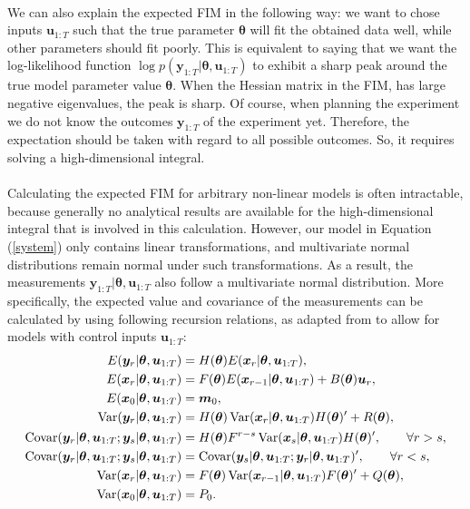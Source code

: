 \\
We can also explain the expected FIM in the following way: we want to chose inputs $\bm u_{1:T}$ such that the true parameter $\bm \theta$ will fit the obtained data well, while other parameters should fit poorly. This is equivalent to saying that we want the log-likelihood function $\log p(\bm y_{1:T}|\bm \theta, \bm u_{1:T})$ to exhibit a sharp peak around the true model parameter value $\bm \theta$. When the Hessian matrix in the FIM, has large negative eigenvalues, the peak is sharp. Of course, when planning the experiment we do not know the outcomes $\bm y_{1:T}$ of the experiment yet. Therefore, the expectation should be taken with regard to all possible outcomes. So, it requires solving a high-dimensional integral.  
\\
\\
Calculating the expected FIM for arbitrary non-linear models is often intractable, because generally no analytical results are available for the high-dimensional integral that is involved in this calculation. However, our model in Equation (\ref{system}) only contains linear transformations, and multivariate normal distributions remain normal under such transformations. As a result, the measurements $\bm y_{1:T}|\bm \theta, \bm u_{1:T}$ also follow a multivariate normal distribution. More specifically, the expected value and covariance of the measurements can be calculated by using following recursion relations, as adapted from \textcite{cavanaugh} to allow for models with control inputs $\bm u_{1:T}$:
\begin{equation}
\begin{aligned}
E(\bm y_r |\bm \theta, \bm u_{1:T})
&= H(\bm \theta)E(\bm x_r |\bm \theta, \bm u_{1:T}),\\
E(\bm x_r |\bm \theta, \bm u_{1:T})
&= F(\bm \theta)E(\bm x_{r-1} |\bm \theta, \bm u_{1:T}) + B(\bm \theta)\bm u_r,\\
E(\bm x_0|\bm \theta, \bm u_{1:T})
&= \bm m_0, \\
\operatorname{\mathrm{Var}} (\bm y_r |\bm \theta, \bm u_{1:T})
&= H(\bm \theta)\operatorname{\mathrm{Var}} (\bm x_r |\bm \theta, \bm u_{1:T})H(\bm \theta)' + R(\bm \theta),\\
\operatorname{\mathrm{Covar}} (\bm y_r |\bm \theta, \bm u_{1:T};\bm y_s |\bm \theta, \bm u_{1:T})
&= H(\bm \theta)F^{r-s}\operatorname{\mathrm{Var}} (\bm x_s |\bm \theta, \bm u_{1:T})H(\bm \theta)',
\qquad \forall r>s,\\
\operatorname{\mathrm{Covar}} (\bm y_r |\bm \theta, \bm u_{1:T};\bm y_s |\bm \theta, \bm u_{1:T})
&=\operatorname{\mathrm{Covar}} (\bm y_s |\bm \theta, \bm u_{1:T};\bm y_r |\bm \theta, \bm u_{1:T})', 
\qquad \forall r<s,\\
\operatorname{\mathrm{Var}} (\bm x_r |\bm \theta, \bm u_{1:T})
&= F(\bm \theta)\operatorname{\mathrm{Var}} (\bm x_{r-1} |\bm \theta, \bm u_{1:T})F(\bm \theta)' + Q(\bm \theta),\\
\operatorname{\mathrm{Var}} (\bm x_0 |\bm \theta, \bm u_{1:T})
&= P_0.
\label{recursion0}
\end{aligned}
\end{equation}

